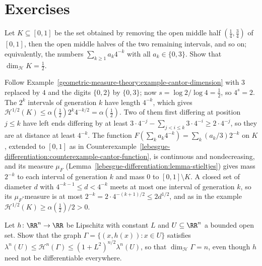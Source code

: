 \section{Exercises}\label{geometric-measure-theory:section-exercises}

\begin{exercise}\label{geometric-measure-theory:exercise-middle-half-cantor}
Let $K \subseteq [0, 1]$ be the set obtained by removing the open middle half $(\frac14, \frac34)$ of $[0, 1]$, then the open middle halves of the two remaining intervals, and so on; equivalently, the
numbers $\sum_{k \geq 1}a_k4^{-k}$ with all $a_k \in \{0, 3\}$. Show that $\dim_{\mathcal{H}}K = \frac12$.
\end{exercise}

\begin{solution}
Follow Example~\ref{geometric-measure-theory:example-cantor-dimension} with $3$ replaced by $4$ and the digits $\{0, 2\}$ by $\{0, 3\}$; now $s = \log 2/\log 4 = \frac12$, so $4^s = 2$. The $2^k$ intervals of
generation $k$ have length $4^{-k}$, which gives $\mathcal{H}^{1/2}(K) \leq \alpha(\frac12)2^k4^{-k/2} = \alpha(\frac12)$. Two of them first differing at position $j \leq k$ have left ends differing by at least
$3 \cdot 4^{-j} - \sum_{j < i \leq k}3 \cdot 4^{-i} \geq 2 \cdot 4^{-j}$, so they are at distance at least $4^{-k}$. The function $F(\sum_ka_k4^{-k}) = \sum_k(a_k/3)2^{-k}$ on $K$, extended to
$[0, 1]$ as in Counterexample~\ref{lebesgue-differentiation:counterexample-cantor-function}, is continuous and nondecreasing, and its measure $\mu_F$ (Lemma~\ref{lebesgue-differentiation:lemma-stieltjes}) gives mass
$2^{-k}$ to each interval of generation $k$ and mass $0$ to $[0, 1] \setminus K$. A closed set of diameter $d$ with $4^{-k-1} \leq d < 4^{-k}$ meets at most one interval of generation $k$, so its
$\mu_F$-measure is at most $2^{-k} = 2 \cdot 4^{-(k+1)/2} \leq 2d^{1/2}$, and as in the example $\mathcal{H}^{1/2}(K) \geq \alpha(\frac12)/2 > 0$.
\end{solution}

\begin{exercise}\label{geometric-measure-theory:exercise-lipschitz-graph}
Let $h \colon \RR^n \to \RR$ be Lipschitz with constant $L$ and $U \subseteq \RR^n$ a bounded open set. Show that the graph $\Gamma = \{(x, h(x)) : x \in U\}$ satisfies
$\lambda^n(U) \leq \mathcal{H}^n(\Gamma) \leq (1 + L^2)^{n/2}\lambda^n(U)$, so that $\dim_{\mathcal{H}}\Gamma = n$, even though $h$ need not be differentiable everywhere.
\end{exercise}

